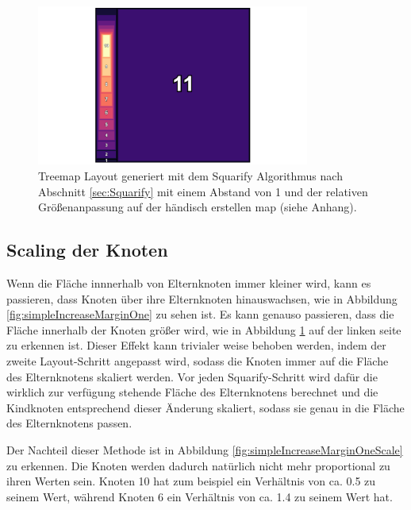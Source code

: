 \begin{figure}
    \centering
    \includegraphics[width=0.8\textwidth]{images/increaseMarginOne.png}
    \caption{Treemap Layout generiert mit dem Squarify Algorithmus nach Abschnitt \ref{sec:Squarify} mit einem Abstand von 1 und der relativen Größenanpassung auf der händisch erstellen map (siehe Anhang).}
    \label{fig:relativeIncreaseMarginOne}
\end{figure}

\subsection{Scaling der Knoten} \label{sec:ScalingKnoten}
Wenn die Fläche innnerhalb von Elternknoten immer kleiner wird, kann es passieren, dass Knoten über ihre Elternknoten hinauswachsen, wie in Abbildung \ref{fig:simpleIncreaseMarginOne} zu sehen ist. Es kann genauso passieren, dass die Fläche innerhalb der Knoten größer wird, wie in Abbildung \ref{fig:relativeIncreaseMarginOne} auf der linken seite zu erkennen ist. Dieser Effekt kann trivialer weise behoben werden, indem der zweite Layout-Schritt angepasst wird, sodass die Knoten immer auf die Fläche des Elternknotens skaliert werden. 
Vor jeden Squarify-Schritt wird dafür die wirklich zur verfügung stehende Fläche des Elternknotens berechnet und die Kindknoten entsprechend dieser Änderung skaliert, sodass sie genau in die Fläche des Elternknotens passen.

Der Nachteil dieser Methode ist in Abbildung \ref{fig:simpleIncreaseMarginOneScale} zu erkennen. Die Knoten werden dadurch natürlich nicht mehr proportional zu ihren Werten sein. Knoten 10 hat zum beispiel ein Verhältnis von ca. 0.5 zu seinem Wert, während Knoten 6 ein Verhältnis von ca. 1.4 zu seinem Wert hat.

